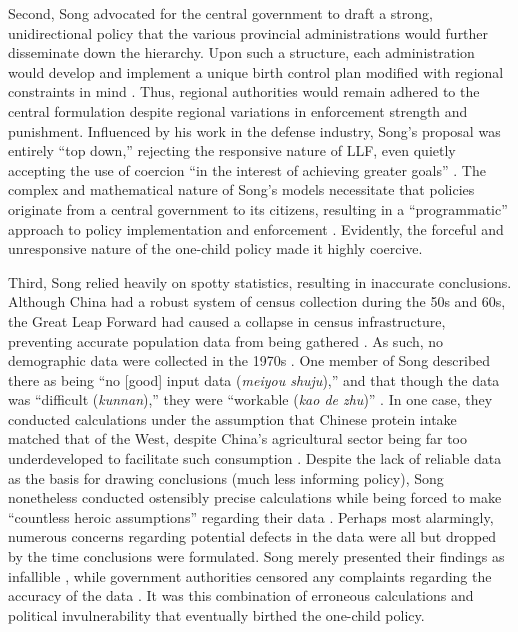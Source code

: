 Second, Song advocated for the central government to draft a strong, unidirectional policy that the various provincial administrations would further disseminate down the hierarchy. Upon such a structure, each administration would develop and implement a unique birth control plan modified with regional constraints in mind \autocite[pp.\ 29--32]{SongTuanYu1985}. Thus, regional authorities would remain adhered to the central formulation despite regional variations in enforcement strength and punishment. Influenced by his work in the defense industry, Song’s proposal was entirely “top down,” rejecting the responsive nature of LLF, even quietly accepting the use of coercion “in the interest of achieving greater goals” \autocite[p.\ 166]{Greenhalgh2008JustOneChild}. The complex and mathematical nature of Song’s models necessitate that policies originate from a central government to its citizens, resulting in a “programmatic” approach to policy implementation and enforcement \autocite[p.\ 262]{ArthurMcNicoll1975}. Evidently, the forceful and unresponsive nature of the one-child policy made it highly coercive.

Third, Song relied heavily on spotty statistics, resulting in inaccurate conclusions. Although China had a robust system of census collection during the 50s and 60s, the Great Leap Forward had caused a collapse in census infrastructure, preventing accurate population data from being gathered \autocite[chap.\ 2]{Banister1987}. As such, no demographic data were collected in the 1970s \autocite[p.\ 62]{Greenhalgh2008JustOneChild}. One member of Song described there as being “no [good] input data (\emph{meiyou shuju}),” and that though the data was “difficult (\emph{kunnan}),” they were “workable (\emph{kao de zhu})” \autocite[p.\ 161]{Greenhalgh2008JustOneChild}. In one case, they conducted calculations under the assumption that Chinese protein intake matched that of the West, despite China’s agricultural sector being far too underdeveloped to facilitate such consumption \autocite[p.\ 159]{Greenhalgh2008JustOneChild}. Despite the lack of reliable data as the basis for drawing conclusions (much less informing policy), Song nonetheless conducted ostensibly precise calculations while being forced to make “countless heroic assumptions” regarding their data \autocite{Greenhalgh2008JustOneChild}. Perhaps most alarmingly, numerous concerns regarding potential defects in the data were all but dropped by the time conclusions were formulated. Song merely presented their findings as infallible \autocite[pp.\ 161, 217]{Greenhalgh2008JustOneChild}, while government authorities censored any complaints regarding the accuracy of the data \autocite[pp.\ 257--259]{Greenhalgh2008JustOneChild}. It was this combination of erroneous calculations and political invulnerability that eventually birthed the one-child policy.

